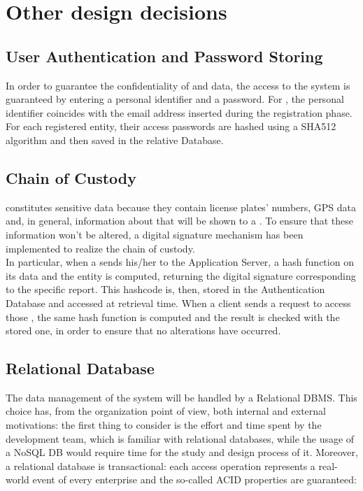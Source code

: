 \documentclass[../../DD.tex]{subfiles}
\begin{document}
\section{Other design decisions\label{sect:2.7}}

\subsection{User Authentication and Password Storing\label{2.7.1}}
In order to guarantee the confidentiality of  and  data, the access to the system is guaranteed by entering a personal identifier and a password. For , the personal identifier coincides with the email address inserted during the registration phase. \\

For each registered entity, their access passwords are hashed using a SHA512 algorithm and then saved in the relative Database.

\subsection{Chain of Custody\label{2.7.2}}
 constitutes sensitive data because they contain license plates' numbers, GPS data and, in general, information about  that will be shown to a . To ensure that these information won't be altered, a digital signature mechanism has been implemented to realize the chain of custody. \\

In particular, when a  sends his/her  to the Application Server, a hash function on its data and the  entity is computed, returning the digital signature corresponding to the specific report. This hashcode is, then, stored in the Authentication Database and accessed at retrieval time. 
When a  client sends a request to access those , the same hash function is computed and the result is checked with the stored one, in order to ensure that no alterations have occurred. \\



\subsection{Relational Database\label{2.7.3}}
The data management of the system will be handled by a Relational DBMS. This choice has, from the organization point of view, both internal and external motivations: the first thing to consider is the effort and time spent by the development team, which is familiar with relational databases, while the usage of a NoSQL DB would require time for the study and design process of it.
Moreover, a relational database is transactional: each access operation represents a real-world event of every enterprise and the so-called ACID properties are guaranteed:
\end{document}
